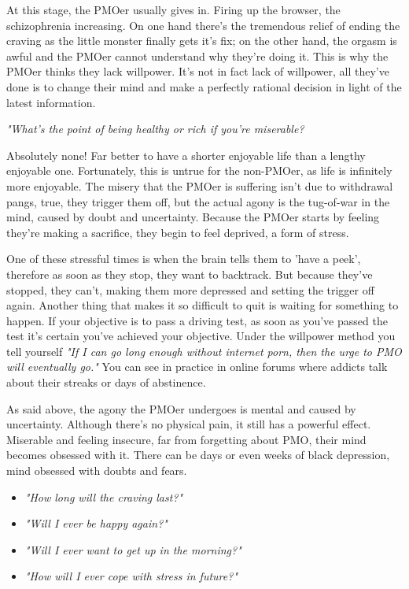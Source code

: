 \documentclass[easypeasy.tex]{subfiles}
\begin{document}
At this stage, the PMOer usually gives in. Firing up the browser, the schizophrenia increasing. On one hand there's the tremendous relief of ending the craving as the little monster finally gets it's fix; on the other hand, the orgasm is awful and the PMOer cannot understand why they're doing it. This is why the PMOer thinks they lack willpower. It's not in fact lack of willpower, all they've done is to change their mind and make a perfectly rational decision in light of the latest information.
  
  \textit{"What's the point of being healthy or rich if you're miserable?}

Absolutely none! Far better to have a shorter enjoyable life than a lengthy enjoyable one. Fortunately, this is untrue for the non-PMOer, as life is infinitely more enjoyable. The misery that the PMOer is suffering isn't due to withdrawal pangs, true, they trigger them off, but the actual agony is the tug-of-war in the mind, caused by doubt and uncertainty. Because the PMOer starts by feeling they're making a sacrifice, they begin to feel deprived, a form of stress.

One of these stressful times is when the brain tells them to 'have a peek', therefore as soon as they stop, they want to backtrack. But because they've stopped, they can't, making them more depressed and setting the trigger off again. Another thing that makes it so difficult to quit is waiting for something to happen. If your objective is to pass a driving test, as soon as you've passed the test it's certain you've achieved your objective. Under the willpower method you tell yourself \textit{"If I can go long enough without internet porn, then the urge to PMO will eventually go."} You can see in practice in online forums where addicts talk about their streaks or days of abstinence.

As said above, the agony the PMOer undergoes is mental and caused by uncertainty. Although there's no physical pain, it still has a powerful effect. Miserable and feeling insecure, far from forgetting about PMO, their mind becomes obsessed with it. There can be days or even weeks of black depression, mind obsessed with doubts and fears.

\begin{itemize}
  \item \textit{"How long will the craving last?"}
  \item \textit{"Will I ever be happy again?"}
  \item \textit{"Will I ever want to get up in the morning?"}
  \item \textit{"How will I ever cope with stress in future?"}
\end{itemize}
\end{document}
